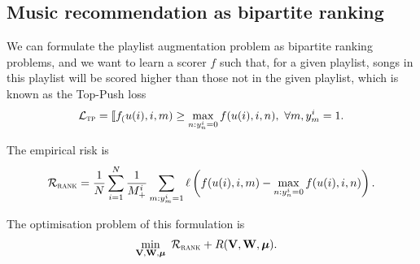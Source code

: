 \subsection{Music recommendation as bipartite ranking}

We can formulate the playlist augmentation problem as bipartite ranking problems, 
and we want to learn a scorer $f$ such that, for a given playlist, 
songs in this playlist will be scored higher than those not in the given playlist,
which is known as the Top-Push loss~\cite{li2014top}
\begin{equation*}
\mathcal{L}_\textsc{tp} = \llbracket f_(u(i), i, m) \ge \max_{n: y_n^i=0} f(u(i), i, n), \ \forall m, y_m^i = 1.
\end{equation*}

The empirical risk is
$$
\mathcal{R}_\textsc{rank} 
= \frac{1}{N} \sum_{i=1}^N \frac{1}{M_+^i} \sum_{m: y_m^i = 1} \ell \left( f(u(i), i, m) - \max_{n: y_n^i = 0} f(u(i), i, n) \right).
$$

The optimisation problem of this formulation is
\begin{equation}
\label{eq:unconsopt}
\begin{aligned}
&\min_{\mathbf{V}, \mathbf{W}, \bm{\mu}} \ \mathcal{R}_\textsc{rank} + R(\mathbf{V}, \mathbf{W}, \bm{\mu}).
\end{aligned}
\end{equation}
